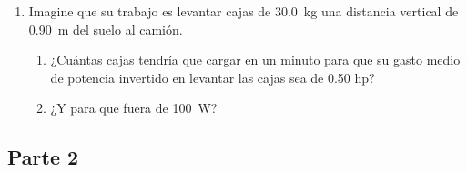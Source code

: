 \documentclass[Física - Práctica.root.tex]{subfiles}
\begin{document}
\begin{enumerate}
  \item Imagine que su trabajo es levantar cajas de \SI{30,0}{\kilo\gram} una distancia vertical de \SI{0,90}{\meter} del
        suelo al camión.
        \begin{enumerate}
          \item ¿Cuántas cajas tendría que cargar en un minuto para que su gasto medio de potencia
                invertido en levantar las cajas sea de \num{0,50} hp?
          \item ¿Y para que fuera de \SI{100}{\watt}?
        \end{enumerate}
\end{enumerate}

\subsection{Parte 2}
\begin{enumerate}

\end{enumerate}
\end{document}
